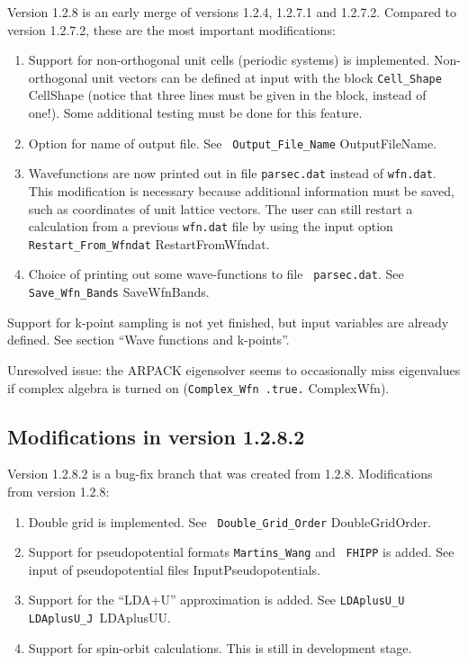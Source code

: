 \documentclass{article}
\begin{document}
Version 1.2.8 is an early merge of versions 1.2.4, 1.2.7.1 and
1.2.7.2. Compared to version 1.2.7.2, these are the most important
modifications:

\begin{enumerate}
\item Support for non-orthogonal unit cells (periodic systems) is
  implemented. Non-orthogonal unit vectors can be defined at input
  with the block {\tt Cell\_Shape} {CellShape} (notice that
  three lines must be given in the block, instead of one!). Some
  additional testing must be done for this feature.
\item Option for name of output file. See {\tt
 Output\_File\_Name} {OutputFileName}.
\item Wavefunctions are now printed out in file {\tt parsec.dat}
  instead of {\tt wfn.dat}. This modification is necessary because
  additional information must be saved, such as coordinates of unit
  lattice vectors. The user can still restart a calculation from
  a previous {\tt wfn.dat} file by using the input option {\tt
  Restart\_From\_Wfndat} {RestartFromWfndat}.
\item Choice of printing out some wave-functions to file {\tt
  parsec.dat}. See {\tt Save\_Wfn\_Bands} {SaveWfnBands}.
\end{enumerate}

Support for k-point sampling is not yet finished, but input variables
are already defined. See section ``Wave functions and k-points''.

Unresolved issue: the ARPACK eigensolver seems to occasionally miss eigenvalues
if complex algebra is turned on ({\tt Complex\_Wfn .true.}
{ComplexWfn}).

\subsection{Modifications in version 1.2.8.2}

Version 1.2.8.2 is a bug-fix branch that was created from
1.2.8. Modifications from version 1.2.8:

\begin{enumerate}
\item Double grid is implemented. See {\tt
 Double\_Grid\_Order} {DoubleGridOrder}.

\item Support for pseudopotential formats {\tt Martins\_Wang} and {\tt
  FHIPP} is added. See { input of pseudopotential files}
{InputPseudopotentials}.

\item Support for the ``LDA+U'' approximation is added. See
  {\tt LDAplusU\_U LDAplusU\_J }{LDAplusUU}.

\item Support for spin-orbit calculations. This is still in development stage.

\end{enumerate}
\end{document}

